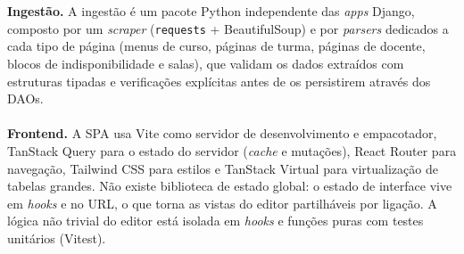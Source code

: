 \documentclass[10pt]{article}
\begin{document}
    \\\\
    \textbf{Ingestão.} A ingestão é um pacote Python independente das \emph{apps} Django, composto por um \emph{scraper} (\texttt{requests} + BeautifulSoup) e por \emph{parsers} dedicados a cada tipo de página (menus de curso, páginas de turma, páginas de docente, blocos de indisponibilidade e salas), que validam os dados extraídos com estruturas tipadas e verificações explícitas antes de os persistirem através dos DAOs.
    \\\\
    \textbf{Frontend.} A SPA usa Vite como servidor de desenvolvimento e empacotador, TanStack Query para o estado do servidor (\emph{cache} e mutações), React Router para navegação, Tailwind CSS para estilos e TanStack Virtual para virtualização de tabelas grandes. Não existe biblioteca de estado global: o estado de interface vive em \emph{hooks} e no URL, o que torna as vistas do editor partilháveis por ligação. A lógica não trivial do editor está isolada em \emph{hooks} e funções puras com testes unitários (Vitest).

\begin{center}
\label{fig:arquitetura}
\end{center}
\end{document}

